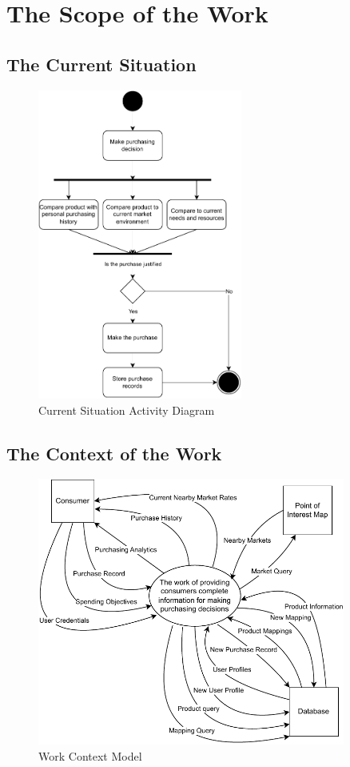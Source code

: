 \documentclass[12pt]{article}
\begin{document}
\section{The Scope of the Work}
\subsection{The Current Situation}
\begin{figure}[H]
    \centering
    \includegraphics[width=0.6\textwidth]{currentsituation}
    \caption{Current Situation Activity Diagram}
    \label{fig:currentsituation}
\end{figure}
\subsection{The Context of the Work}
\begin{figure}[H]
    \centering
    \includegraphics[width=0.9\textwidth]{workcontext}
    \caption{Work Context Model}
    \label{fig:workcontext}
\end{figure}
\end{document}
